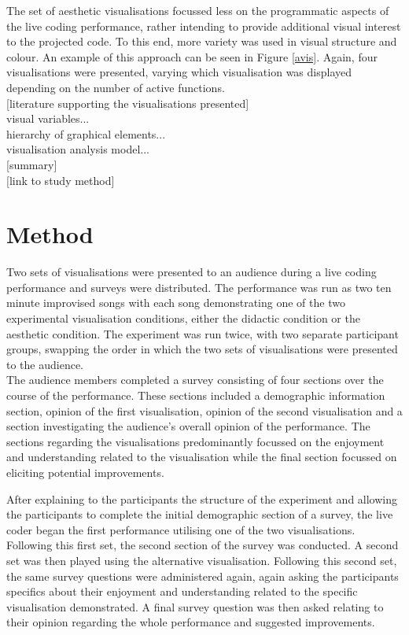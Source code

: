 \documentclass{article}
\begin{document}
The set of aesthetic visualisations focussed less on the programmatic aspects of the live coding performance, rather intending to provide additional visual interest to the projected code. To this end, more variety was used in visual structure and colour. An example of this approach can be seen in Figure \ref{avis}. Again, four visualisations were presented, varying which visualisation was displayed depending on the number of active functions.\\

[literature supporting the visualisations presented]\\

visual variables...\\

hierarchy of graphical elements...\\

visualisation analysis model...\\

[summary]\\

[link to study method]\\

\section{Method}
Two sets of visualisations were presented to an audience during a live coding performance and surveys were distributed. The performance was run as two ten minute improvised songs with each song demonstrating one of the two experimental visualisation conditions, either the didactic condition or the aesthetic condition. The experiment was run twice, with two separate participant groups, swapping the order in which the two sets of visualisations were presented to the audience.\\

The audience members completed a survey consisting of four sections over the course of the performance. These sections included a demographic information section, opinion of the first visualisation, opinion of the second visualisation and a section investigating the audience's overall opinion of the performance. The sections regarding the visualisations predominantly focussed on the enjoyment and understanding related to the visualisation while the final section focussed on eliciting potential improvements.

After explaining to the participants the structure of the experiment and allowing the participants to complete the initial demographic section of a survey, the live coder began the first performance utilising one of the two visualisations. Following this first set, the second section of the survey was conducted. A second set was then played using the alternative visualisation. Following this second set, the same survey questions were administered again, again asking the participants specifics about their enjoyment and understanding related to the specific visualisation demonstrated. A final survey question was then asked relating to their opinion regarding the whole performance and suggested improvements.
\end{document}
